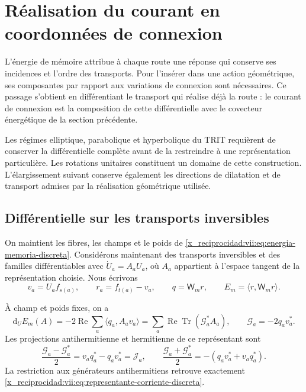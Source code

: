 \chapter{Réalisation du courant en coordonnées de connexion}
\label{x_reciprocidad:vii:sec:composicion-corriente-conexion}

L'énergie de mémoire attribue à chaque route une réponse qui conserve ses incidences et l'ordre des transports. Pour l'insérer dans une action géométrique, ses composantes par rapport aux variations de connexion sont nécessaires. Ce passage s'obtient en différentiant le transport qui réalise déjà la route : le courant de connexion est la composition de cette différentielle avec le covecteur énergétique de la section précédente.

Les régimes elliptique, parabolique et hyperbolique du TRIT requièrent de
conserver la différentielle complète avant de la restreindre à une
représentation particulière. Les rotations unitaires constituent un
domaine de cette construction. L'élargissement suivant conserve également
les directions de dilatation et de transport admises par la réalisation
géométrique utilisée.

\section{Différentielle sur les transports inversibles}

On maintient les fibres, les champs et le poids de
\eqref{x_reciprocidad:vii:eq:energia-memoria-discreta}. Considérons maintenant des transports
inversibles et des familles différentiables avec
\(\dot U_a=A_aU_a\), où \(A_a\) appartient à l'espace tangent
de la représentation choisie. Nous écrivons
\[
 v_a=U_af_{s(a)},\qquad r_a=f_{t(a)}-v_a,\qquad
 q=\mathsf W_mr,\qquad E_m=\langle r,\mathsf W_mr\rangle.
\]

\begin{proposition}
\label{x_reciprocidad:vii:prop:diferencial-invertible}
À champ et poids fixes, on a
\begin{equation}
 \mathrm d_UE_m(A)=-2\operatorname{Re}\sum_a
       \langle q_a,A_av_a\rangle
 =\sum_a\operatorname{Re}\operatorname{Tr}(\mathcal G_a^*A_a),
 \qquad \mathcal G_a=-2q_av_a^*.
 \label{x_reciprocidad:vii:eq:gradiente-transporte-completo}
\end{equation}
Les projections antihermitienne et hermitienne de ce représentant sont
\begin{equation}
 \frac{\mathcal G_a-\mathcal G_a^*}{2}
   =v_aq_a^*-q_av_a^*=\mathcal J_a,
 \qquad
 \frac{\mathcal G_a+\mathcal G_a^*}{2}
   =-(q_av_a^*+v_aq_a^*).
 \label{x_reciprocidad:vii:eq:proyecciones-gradiente-memoria}
\end{equation}
La restriction aux générateurs antihermitiens retrouve exactement
\eqref{x_reciprocidad:vii:eq:representante-corriente-discreta}.
\end{proposition}

